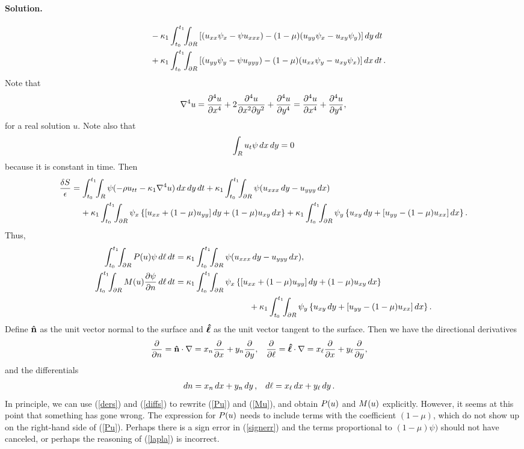 \documentclass[11pt]{article}
\newcommand{\refeq}[1]{(\ref{#1})}
\newcommand{\beq}{\begin{equation*}}
\newcommand{\eeq}{\end{equation*}}
\newcommand{\beqn}{\begin{equation}}
\newcommand{\eeqn}{\end{equation}}
\newenvironment{solution}
{
    \paragraph{Solution.}
    \ignorespaces
}
{
}
\begin{document}
\begin{solution}
\begin{align*}
		&\phantom{=\ } - \kappa_1 \int_{t_0}^{t_1} \!\!\int_{\partial R} \left[ (u_{xx} \psi_{x} - \psi u_{xxx}) - (1 - \mu) (u_{yy} \psi_{x} - u_{xy} \psi_{y}) \right] \dd{y} \dd{t} \\
		&\phantom{=\ } + \kappa_1 \int_{t_0}^{t_1} \!\!\int_{\partial R} \left[ (u_{yy} \psi_{y} - \psi u_{yyy}) - (1 - \mu) (u_{xx} \psi_{y} - u_{xy} \psi_{x}) \right] \dd{x} \dd{t}.
	\end{align*}
	Note that
	\beqn \label{lapla}
		\lapw u = \pdv[4]{u}{x} + 2 \frac{\partial^4 u}{\partial x^2 \partial y^2} + \pdv[4]{u}{y} = \pdv[4]{u}{x} + \pdv[4]{u}{y},
	\eeqn
	for a real solution $u$.  Note also that
	\beq
		\intr \ut \psi \dd{x} \dd{y} = 0
	\eeq
	because it is constant in time.  Then
	\begin{align} \label{final}
		\frac{\dS}{\eps} &= \inttr \psi (-\rho \utt - \kaq \lapw u) \drt + \kaq \inttdr \psi (\uxxx \dd{y} - \uyyy \dd{x}) \\
		&\phantom{=\ } + \kaq \inttdr \psix \left\{ [\uxx + (1 - \mu) \uyy] \dd{y} + (1 - \mu) \uxy \dd{x} \right\} + \kaq \inttdr \psiy \left\{ \uxy \dd{y} + [\uyy - (1 - \mu) \uxx] \dd{x} \right\}. \notag
	\end{align}
	Thus,
	\begin{align}
		\inttdr \Pu \psi \dlt &= \kaq \inttdr \psi (\uxxx \dd{y} - \uyyy \dd{x}), \label{Pu} \\
		\inttdr \Mu \pdv{\psi}{n} \dlt &= \kaq \inttdr \psix \left\{ [\uxx + (1 - \mu) \uyy] \dd{y} + (1 - \mu) \uxy \dd{x} \right\} \notag \\
		&\phantom{mmmmmmmmmm} + \kaq \inttdr \psiy \left\{ \uxy \dd{y} + [\uyy - (1 - \mu) \uxx] \dd{x} \right\}. \label{Mu}
	\end{align}
	Define $\mathbf{\hat{n}}$ as the unit vector normal to the surface and $\boldsymbol{\hat{\ell}}$ as the unit vector tangent to the surface.  Then we have the directional derivatives
	\begin{align} \label{ders}
		\pdv{}{n} &= \mathbf{\hat{n}} \cdot \nabla = x_n \pdv{}{x} + y_n \pdv{}{y}, &
		\pdv{}{\ell} &= \boldsymbol{\hat{\ell}} \cdot \nabla = x_\ell \pdv{}{x} + y_\ell \pdv{}{y},
	\end{align}
	and the differentials
	\begin{align} \label{diffs}
		\dd{n} &= x_n \dd{x} + y_n \dd{y}, &
		\dd{\ell} &= x_\ell \dd{x} + y_\ell \dd{y}.
	\end{align}
	In principle, we can use \refeq{ders} and \refeq{diffs} to rewrite \refeq{Pu} and \refeq{Mu}, and obtain $P(u)$ and $M(u)$ explicitly.  However, it seems at this point that something has gone wrong.  The expression for $P(u)$ needs to include terms with the coefficient $(1 - \mu)$, which do not show up on the right-hand side of \refeq{Pu}.  Perhaps there is a sign error in \refeq{signerr} and the terms proportional to $(1 - \mu) \psi)$ should not have canceled, or perhaps the reasoning of \refeq{lapla} is incorrect.


\end{solution}
\end{document}
